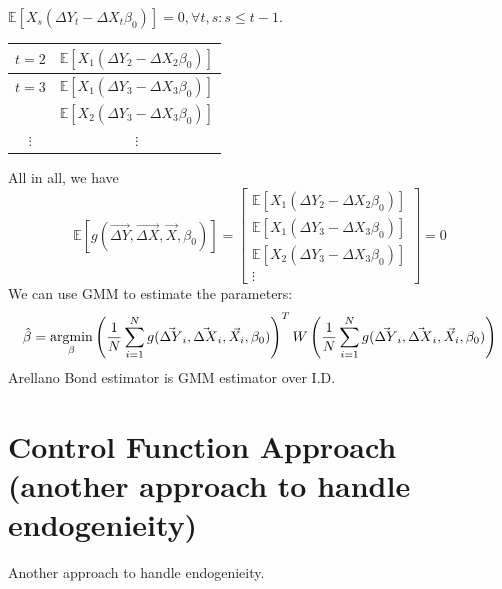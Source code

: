 \documentclass[11pt]{elegantbook}
\newcommand{\argmin}{\operatornamewithlimits{argmin}}
\begin{document}
$\mathbb{E}[X_s\left(\Delta Y_t- \Delta X_t\beta_0\right)]=0, \forall t,s:s\leq t-1$.
\begin{center}
    \begin{tabular}{cc}
        \hline
        $t=2$& $\mathbb{E}[X_1\left(\Delta Y_2- \Delta X_2\beta_0\right)]$\\
        \hline
        $t=3$& $\mathbb{E}[X_1\left(\Delta Y_3- \Delta X_3\beta_0\right)]$\\
        & $\mathbb{E}[X_2\left(\Delta Y_3- \Delta X_3\beta_0\right)]$\\
        \hline
        $\vdots$&$\vdots$
    \end{tabular}
\end{center}
All in all, we have $$\mathbb{E}[g(\vec{\Delta Y},\vec{\Delta X},\vec{X},\beta_0)]=\begin{bmatrix}
    \mathbb{E}[X_1\left(\Delta Y_2- \Delta X_2\beta_0\right)]\\
    \mathbb{E}[X_1\left(\Delta Y_3- \Delta X_3\beta_0\right)]\\
    \mathbb{E}[X_2\left(\Delta Y_3- \Delta X_3\beta_0\right)]\\
    \vdots
\end{bmatrix}=0$$
We can use GMM to estimate the parameters:
\begin{equation}
    \begin{aligned}
        \hat{\beta}=\argmin_\beta\left(\frac{1}{N}\sum_{i=1}^Ng(\vec{\Delta Y}_i,\vec{\Delta X}_i,\vec{X}_i,\beta_0)\right)^TW\left(\frac{1}{N}\sum_{i=1}^Ng(\vec{\Delta Y}_i,\vec{\Delta X}_i,\vec{X}_i,\beta_0)\right)
    \end{aligned}
    \nonumber
\end{equation}
Arellano Bond estimator is GMM estimator over I.D.

\section{Control Function Approach (another approach to handle endogenieity)}
Another approach to handle endogenieity.
\end{document}
